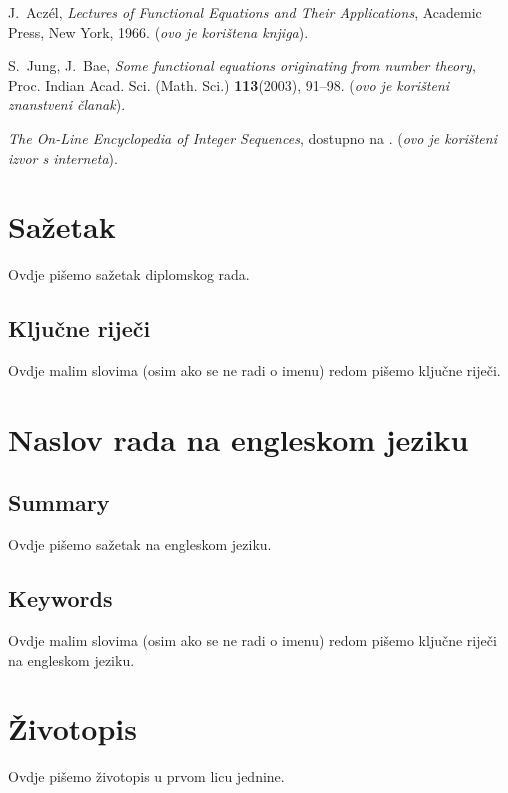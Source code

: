 \documentclass{mathos}
\begin{document}




\begin{thebibliography}{30}
{\sc J.~Acz\'{e}l}, {\em Lectures of Functional Equations and Their Applications}, Academic Press, New York, 1966. ({\it ovo je korištena knjiga}).

{\sc S.~Jung, J.~Bae}, {\em  Some functional equations originating from number theory}, Proc. Indian Acad. Sci. (Math. Sci.) {\bf{113}}(2003), 91--98.
({\it ovo je korišteni znanstveni članak}).

\bibitem{ } {\em The On-Line Encyclopedia of Integer Sequences}, dostupno na . ({\it ovo je korišteni izvor s interneta}).
\end{thebibliography}




\chapter*{Sažetak}

Ovdje pišemo sažetak diplomskog rada.

\section*{Ključne riječi}

Ovdje malim slovima (osim ako se ne radi o imenu) redom pišemo ključne riječi.




\chapter*{Naslov rada na engleskom jeziku}

\section*{Summary}

Ovdje pišemo sažetak na engleskom jeziku.

\section*{Keywords}

Ovdje malim slovima (osim ako se ne radi o imenu) redom pišemo ključne riječi na engleskom jeziku.




\chapter*{Životopis}

Ovdje pišemo životopis u prvom licu jednine.
\end{document}
